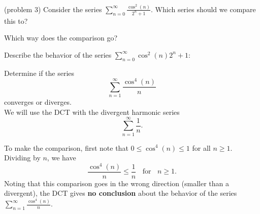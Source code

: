 \documentclass[handout]{ximera}
\begin{document}
\begin{problem}(problem 3)
Consider the series $\sum_{n=0}^\infty \frac{\cos^2(n)}{2^n + 1}$.
Which series should we compare this to?

\begin{multipleChoice}
\end{multipleChoice}

Which way does the comparison go?
\begin{multipleChoice}
\end{multipleChoice}

Describe the behavior of the series $\sum_{n=0}^\infty {\cos^2(n)}{2^n + 1}:$
\begin{multipleChoice}
\end{multipleChoice}

\end{problem}




\begin{example}[example 4] %
Determine if the series 
\[
\sum_{n=1}^\infty \frac{\cos^4(n)}{n}
\]
 converges or diverges.\\
We will use the DCT with the divergent harmonic series 
\[
\sum_{n=1}^\infty \frac{1}{n}.
\]
 
To make the comparison, first note that $0 \leq \cos^4(n) \leq 1$ for all $n \geq 1$. Dividing by $n$,
we have 
\[
\frac{\cos^4(n)}{n} \leq \frac{1}{n} \; \; \text{ for } \; \; n \geq 1.
\]
Noting that this comparison goes in the wrong direction (smaller than a divergent), the DCT gives \textbf{no conclusion}
about the behavior of the series $\sum_{n=1}^\infty \frac{\cos^4(n)}{n}$.
\end{example}
\end{document}
